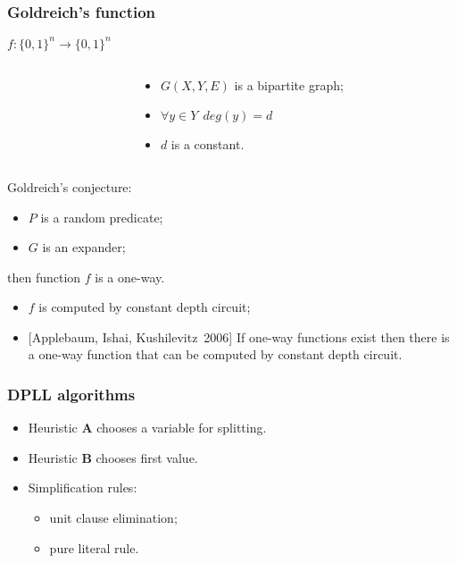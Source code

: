 \begin{frame}
	\frametitle{Goldreich's function}
	$f:\{0, 1\}^n \rightarrow \{0, 1\}^n$

    \pause

    \begin{columns}
    	\begin{column}{5.5cm}
            
        \end{column}

        \pause
        \pause
        \begin{column}{5.5cm}
            \begin{itemize}
	            \item $G(X, Y, E)$ is a bipartite graph;
            	\pause
                \item $\forall y \in Y ~~ deg(y) = d$
            	\pause
            	\item $d$ is a constant.
            \end{itemize}
        \end{column}
	\end{columns}
    
	\pause

    Goldreich's conjecture:
    \begin{itemize}
	    \item $P$ is a random predicate;
    	\item $G$ is an expander;
    \end{itemize}
    then function $f$ is a one-way.

    \pause
    \begin{itemize}
	    \item $f$ is computed by constant depth circuit;
    	\pause
	    \item{} [Applebaum, Ishai, Kushilevitz~2006] If one-way
		    functions exist then there is a one-way function that can
            be computed by constant depth circuit.
    \end{itemize}
\end{frame}

\begin{frame}
	\frametitle{DPLL algorithms}

   	
    
	\pause
    \pause
    \pause
    \pause
    \pause
    \begin{itemize}
        \item Heuristic $\mathbf{A}$ chooses a variable for splitting.
    	\pause
	    \item Heuristic $\mathbf{B}$ chooses first value.
    	\pause
    	\item Simplification rules:
	    \begin{itemize}
            \item unit clause elimination;
        	\item pure literal rule.
    	\end{itemize}
    \end{itemize}

\end{frame}

